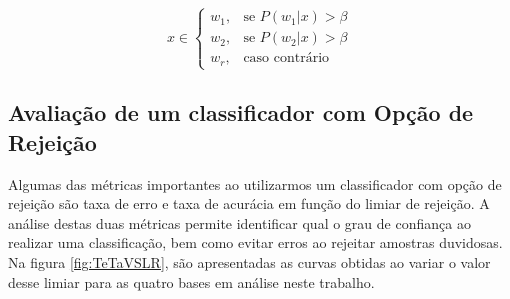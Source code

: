\documentclass[ 
	article,			%
	11pt,				%
	oneside,			%
	a4paper,			%
	english,			%
	brazil,				%
	]{abntex2}
\begin{document}
\begin{equation}
x \in \begin{cases}
		w_1,& \text{se }  P(w_1|x) > \beta \\
		w_2,& \text{se }  P(w_2|x) > \beta \\
		w_r,& \text{caso contrário }
	  \end{cases}
\end{equation}

\subsection{Avaliação de um classificador com Opção de Rejeição}
Algumas das métricas importantes ao utilizarmos um classificador com opção de
rejeição são taxa de erro e taxa de acurácia em função do limiar de rejeição. A
análise destas duas métricas permite identificar qual o grau de confiança ao
realizar uma classificação, bem como evitar erros ao rejeitar amostras
duvidosas. Na figura \ref{fig:TeTaVSLR}, são apresentadas as curvas obtidas
ao variar o valor desse limiar para as quatro bases em análise neste trabalho.
\end{document}
